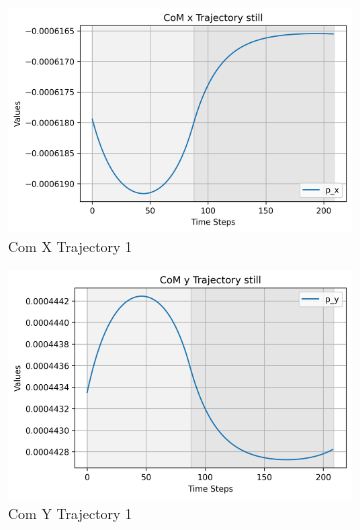 \documentclass[main.tex]{subfiles}
\begin{document}
\begin{figure}[H]
    \centering
    \begin{subfigure}[b]{0.45\textwidth}
        \centering
        \includegraphics[width=\textwidth]{figures/CoM x Trajectory still.png}
        \caption{Com X Trajectory 1}
        \label{fig:sub1_still}
    \end{subfigure}
    \hfill
    \begin{subfigure}[b]{0.45\textwidth}
        \centering
        \includegraphics[width=\textwidth]{figures/CoM y Trajectory still.png}
        \caption{Com Y Trajectory 1}
        \label{fig:sub2_still}
    \end{subfigure}
    \hfill
    \begin{subfigure}[b]{0.45\textwidth}
        \centering

\end{subfigure}
\end{figure}
\end{document}
